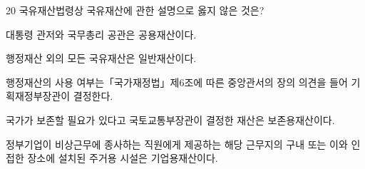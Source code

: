 \begin{question}{20}
국유재산법령상 국유재산에 관한 설명으로 옳지 않은 것은?
\begin{choices}
  \item 대통령 관저와 국무총리 공관은 공용재산이다.
  \item 행정재산 외의 모든 국유재산은 일반재산이다.
  \item 행정재산의 사용 여부는「국가재정법」제6조에 따른 중앙관서의 장의 의견을 들어 기획재정부장관이 결정한다.
  \item 국가가 보존할 필요가 있다고 국토교통부장관이 결정한 재산은 보존용재산이다.
  \item 정부기업이 비상근무에 종사하는 직원에게 제공하는 해당 근무지의 구내 또는 이와 인접한 장소에 설치된 주거용 시설은 기업용재산이다.
\end{choices}
\end{question}

